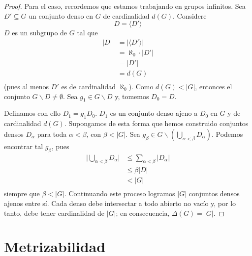 \documentclass[12pt]{report}
\theoremstyle{largebreak}
\newcommand\abs[1]{\ensuremath{\lvert#1\rvert}}
\begin{document}
    \begin{proof}
        Para el caso, recordemos que estamos trabajando en grupos infinitos. Sea $D'\subseteq G$ un conjunto denso en $G$ de cardinalidad $d(G)$. Considere
        \begin{equation*}
            D=\langle D'\rangle
        \end{equation*}
        $D$ es un subgrupo de $G$ tal que
        \begin{equation*}
            \begin{split}
                \abs{D}&=\abs{\langle D'\rangle}\\
                &=\aleph_0\cdot\abs{D'}\\
                &=\abs{D'}\\
                &=d(G)\\
            \end{split}
        \end{equation*}
        (pues al menos $D'$ es de cardinalidad $\aleph_0$). Como $d(G)<\abs{G}$, entonces el conjunto $G\backslash D\neq\emptyset$. Sea $g_1\in G\backslash D$ y, tomemos $D_0=D$.

        Definamos con ello $D_1=g_1D_0$. $D_1$ es un conjunto denso ajeno a $D_0$ en $G$ y de cardinalidad $d(G)$. Supongamos de esta forma que hemos construido conjuntos densos $D_\alpha$ para toda $\alpha<\beta$, con $\beta<\abs{G}$. Sea $g_\beta\in G\backslash\left(\bigcup_{ \alpha<\beta}D_\alpha \right)$. Podemos encontrar tal $g_\beta$, pues
        \begin{equation*}
            \begin{split}
                \abs{\bigcup_{\alpha<\beta}D_\alpha}&\leq\sum_{\alpha<\beta}\abs{D_\alpha}\\
                &\leq\beta\abs{D}\\
                &<\abs{G}\\
            \end{split}
        \end{equation*}
        siempre que $\beta<\abs{G}$. Continuando este proceso logramos $\abs{G}$ conjuntos densos ajenos entre sí. Cada denso debe intersectar a todo abierto no vacío y, por lo tanto, debe tener cardinalidad de $\abs{G}$; en consecuencia, $\Delta(G)=\abs{G}$.
    \end{proof}

    \section{Metrizabilidad}
\end{document}
